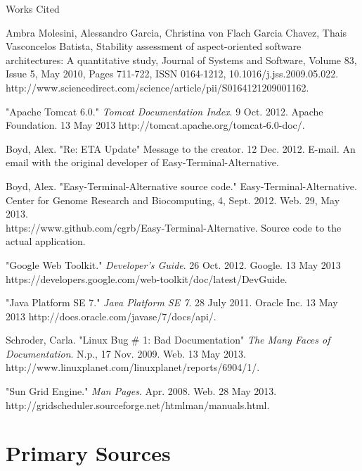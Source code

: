 \documentclass[a4paper,12pt]{article}
\newcommand{\bibent}{\noindent \hangindent 40pt}
\newenvironment{workscited}{ \doublespacing \newpage \begin{center} Works Cited \end{center}}{\newpage }
\begin{document}
\begin{workscited}

  \bibent
 Ambra Molesini, Alessandro Garcia, Christina von Flach Garcia Chavez, Thais Vasconcelos Batista, Stability assessment of aspect-oriented software architectures: A quantitative study, Journal of Systems and Software, Volume 83, Issue 5, May 2010, Pages 711-722, ISSN 0164-1212, 10.1016/j.jss.2009.05.022.
\\http://www.sciencedirect.com/science/article/pii/S0164121209001162. 

 \bibent
 "Apache Tomcat 6.0." \textit{Tomcat Documentation Index}. 9 Oct. 2012. Apache Foundation.  13 May 2013 http://tomcat.apache.org/tomcat-6.0-doc/. 
 
   \bibent
   Boyd, Alex. "Re: ETA Update" Message to the creator. 12 Dec. 2012. E-mail. An email with the original developer of Easy-Terminal-Alternative.
   
 \bibent
 Boyd, Alex. "Easy-Terminal-Alternative source code." Easy-Terminal-Alternative. Center for Genome Research and Biocomputing, 4, Sept. 2012. Web. 29, May 2013. 
\\https://www.github.com/cgrb/Easy-Terminal-Alternative. Source code to the actual application.

 \bibent
 "Google Web Toolkit." \textit{Developer's Guide}. 26 Oct. 2012. Google. 13 May 2013 \\https://developers.google.com/web-toolkit/doc/latest/DevGuide. 

 \bibent
 "Java Platform SE 7." \textit{Java Platform SE 7}. 28 July 2011. Oracle Inc. 13 May 2013 http://docs.oracle.com/javase/7/docs/api/. 


 \bibent
  Schroder, Carla. "Linux Bug \# 1: Bad Documentation" \textit{The Many Faces of Documentation}. N.p., 17 Nov. 2009. Web. 13 May 2013.\\ http://www.linuxplanet.com/linuxplanet/reports/6904/1/. 
  
  \bibent
  "Sun Grid Engine." \textit{Man Pages}. Apr. 2008. Web. 28 May 2013. \\ http://gridscheduler.sourceforge.net/htmlman/manuals.html.
  




 \end{workscited}
 \newpage
 \section{Primary Sources}
\end{document}
